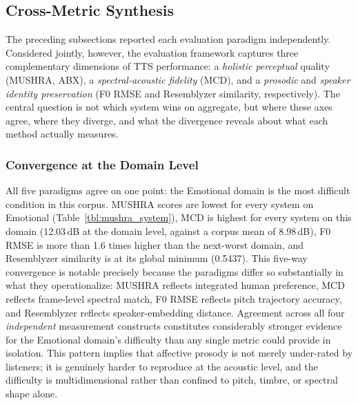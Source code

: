 \documentclass[a4paper,fleqn]{cas-dc}
\begin{document}
    
    \subsection{Cross-Metric Synthesis}\label{sec:results-synthesis}
    
    \hspace*{1.2em} The preceding subsections reported each evaluation paradigm independently. Considered jointly, however, the evaluation framework captures three complementary dimensions of TTS performance: a \textit{holistic perceptual} quality (MUSHRA, ABX), a \textit{spectral-acoustic fidelity} (MCD), and a \textit{prosodic} and \textit{speaker identity preservation} (F0 RMSE and Resemblyzer similarity, respectively). The central question is not which system wins on aggregate, but where these axes agree, where they diverge, and what the divergence reveals about what each method actually measures.
    
    \subsubsection{Convergence at the Domain Level}
    
    \hspace*{1.2em} All five paradigms agree on one point: the Emotional domain is the most difficult condition in this corpus. MUSHRA scores are lowest for every system on Emotional (Table~\ref{tbl:mushra_system}), MCD is highest for
    every system on this domain (12.03\,dB at the domain level, against a
    corpus mean of 8.98\,dB), F0 RMSE is more than 1.6 times higher than
    the next-worst domain, and Resemblyzer similarity is at its global minimum
    (0.5437). This five-way convergence is notable precisely because the
    paradigms differ so substantially in what they operationalize: MUSHRA
    reflects integrated human preference, MCD reflects frame-level spectral
    match, F0 RMSE reflects pitch trajectory accuracy, and Resemblyzer
    reflects speaker-embedding distance. Agreement across all four
    \emph{independent} measurement constructs constitutes considerably
    stronger evidence for the Emotional domain's difficulty than any single
    metric could provide in isolation. This pattern implies that affective
    prosody is not merely under-rated by listeners; it is genuinely harder
    to reproduce at the acoustic level, and the difficulty is multidimensional
    rather than confined to pitch, timbre, or spectral shape alone.
    
\end{document}
